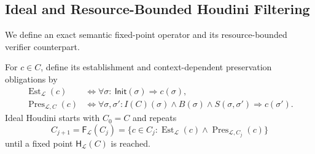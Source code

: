 \subsection{Ideal and Resource-Bounded Houdini Filtering}
\label{app:formal-houdini}

We define an exact semantic fixed-point operator and its resource-bounded
verifier counterpart.

For \(c\in C\), define its establishment and context-dependent preservation
obligations by
\begin{equation}
  \begin{split}
  \operatorname{Est}_{\mathcal L}(c)
    &\iff \forall\sigma:\
      \mathsf{Init}(\sigma)\Rightarrow c(\sigma),\\
  \operatorname{Pres}_{\mathcal L,C}(c)
    &\iff \forall\sigma,\sigma':
      I(C)(\sigma)\land B(\sigma)\land S(\sigma,\sigma')
      \Rightarrow c(\sigma').
  \end{split}
  \label{eq:formal-clause-obligations}
\end{equation}
Ideal Houdini starts with \(C_0=C\) and repeats
\begin{equation}
  C_{j+1}=\mathsf F_{\mathcal L}(C_j)
  =\{c\in C_j:\operatorname{Est}_{\mathcal L}(c)
    \land\operatorname{Pres}_{\mathcal L,C_j}(c)\}
  \label{eq:formal-houdini}
\end{equation}
until a fixed point \(\mathsf H_{\mathcal L}(C)\) is reached.

